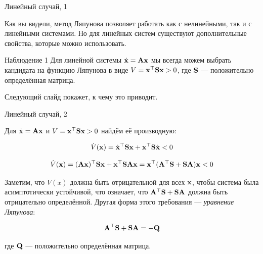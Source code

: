 \documentclass{beamer}
\begin{document}
\begin{frame}{Линейный случай, 1}
	\begin{flushleft}
		
		Как вы видели, метод Ляпунова позволяет работать как с нелинейными, так и с линейными системами. Но для линейных систем существуют дополнительные свойства, которые можно использовать.
		
		\bigskip
		
		\begin{block}{Наблюдение 1}
			Для линейной системы $\dot{\mathbf{x}} = \mathbf{A}\mathbf{x}$ мы всегда можем выбрать кандидата на функцию Ляпунова в виде $V = \mathbf{x}^\top\mathbf{S}\mathbf{x} > 0$, где $\mathbf{S}$ — положительно определённая матрица.
		\end{block}
		
		\bigskip
		
		Следующий слайд покажет, к чему это приводит.
		
	\end{flushleft}
\end{frame}

\begin{frame}{Линейный случай, 2}
	\begin{flushleft}
		
		Для $\dot{\mathbf{x}} = \mathbf{A}\mathbf{x}$ и $V = \mathbf{x}^\top\mathbf{S}\mathbf{x} > 0$ найдём её производную:
		
		\begin{equation}
			\dot V(\mathbf{x}) = \dot{\mathbf{x}}^\top\mathbf{S}\mathbf{x} + 
			\mathbf{x}^\top\mathbf{S}\dot{\mathbf{x}} < 0
		\end{equation}
		
		\begin{equation}
			\dot V(\mathbf{x}) = (\mathbf{A}\mathbf{x})^\top\mathbf{S}\mathbf{x} + 
			\mathbf{x}^\top\mathbf{S}\mathbf{A}\mathbf{x} = 
			\mathbf{x}^\top(\mathbf{A}^\top\mathbf{S} + \mathbf{S}\mathbf{A})\mathbf{x} < 0
		\end{equation}
		
		Заметим, что $\dot V(x)$ должна быть отрицательной для всех $\mathbf{x}$, чтобы система была асимптотически устойчивой, что означает, что $\mathbf{A}^\top\mathbf{S} + \mathbf{S}\mathbf{A}$ должна быть отрицательно определённой. Другая форма этого требования — \emph{уравнение Ляпунова}:
		
		\begin{equation}
			\mathbf{A}^\top\mathbf{S} + \mathbf{S}\mathbf{A} = -\mathbf{Q}
		\end{equation}
		
		где $\mathbf{Q}$ — положительно определённая матрица.
		
	\end{flushleft}
\end{frame}
\end{document}
